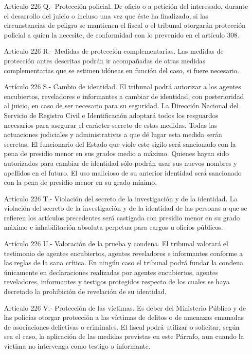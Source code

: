     Artículo 226 Q.- Protección policial. De oficio o a petición del interesado, durante el desarrollo del juicio o incluso una vez que éste ha finalizado, si las circunstancias de peligro se mantienen el fiscal o el tribunal otorgarán protección policial a quien la necesite, de conformidad con lo prevenido en el artículo 308.

    Artículo 226 R.- Medidas de protección complementarias. Las medidas de protección antes descritas podrán ir acompañadas de otras medidas complementarias que se estimen idóneas en función del caso, si fuere necesario.

    Artículo 226 S.- Cambio de identidad. El tribunal podrá autorizar a los agentes encubiertos, reveladores e informantes a cambiar de identidad, con posterioridad al juicio, en caso de ser necesario para su seguridad.
    La Dirección Nacional del Servicio de Registro Civil e Identificación adoptará todos los resguardos necesarios para asegurar el carácter secreto de estas medidas.
    Todas las actuaciones judiciales y administrativas a que dé lugar esta medida serán secretas. El funcionario del Estado que viole este sigilo será sancionado con la pena de presidio menor en sus grados medio a máximo.
    Quienes hayan sido autorizados para cambiar de identidad sólo podrán usar sus nuevos nombres y apellidos en el futuro. El uso malicioso de su anterior identidad será sancionado con la pena de presidio menor en su grado mínimo.

    Artículo 226 T.- Violación del secreto de la investigación y de la identidad. La violación del secreto de la investigación y de la identidad de las personas a que se refieren los artículos precedentes será castigada con presidio menor en su grado máximo e inhabilitación absoluta perpetua para cargos u oficios públicos.

    Artículo 226 U.- Valoración de la prueba y condena. El tribunal valorará el testimonio de agentes encubiertos, agentes reveladores e informantes conforme a las reglas de la sana crítica.
    En ningún caso el tribunal podrá fundar la condena únicamente en declaraciones realizadas por agentes encubiertos, agentes reveladores, informantes y testigos protegidos respecto de los cuales se haya decretado la prohibición de revelación de su identidad.

    Artículo 226 V.- Protección de las víctimas. Es deber del Ministerio Público y de las policías otorgar protección a las víctimas de delitos o de amenazas emanadas de asociaciones delictivas o criminales. El fiscal podrá utilizar o solicitar, según sea el caso, la aplicación de las medidas previstas en este Párrafo, aun cuando la víctima no intervenga como testigo o informante.

